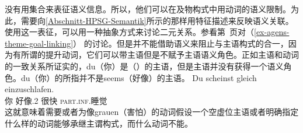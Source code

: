  \citet{MR2001a} 没有用集合来表征语义信息。所以，他们可以在及物构式中用动词的语义限制。为此，需要向\ref{Abschnitt-HPSG-Semantik}所示的那样用特征描述来反映语义关联。使用这一表征，可以用一种抽象方式来讨论二元关系。参看第~\pageref{ex-agens-theme-goal-linking}页对（\ref{ex-agens-theme-goal-linking}） 的讨论。但是并不能借助语义来阻止与主语构式的合一，因为有所谓的提升动词，它们可以带主语但是不赋予主语语义角色。正如主语和动词的一致关系所证实的，du（你）是（）的主语，但是主语并没有获得一个语义角色。du（你）的所指并不是seems（好像）的主语。
\ea
\gll Du scheinst gleich einzuschlafen.\\
     你 好像.2\sg{} 很快 \textsc{part}.\textsc{inf}.睡觉\\
\z
这就意味着需要或者为像grauen（害怕）的动词假设一个空虚位主语或者明确指定什么样的动词能够承继主谓构式，而什么动词不能。

